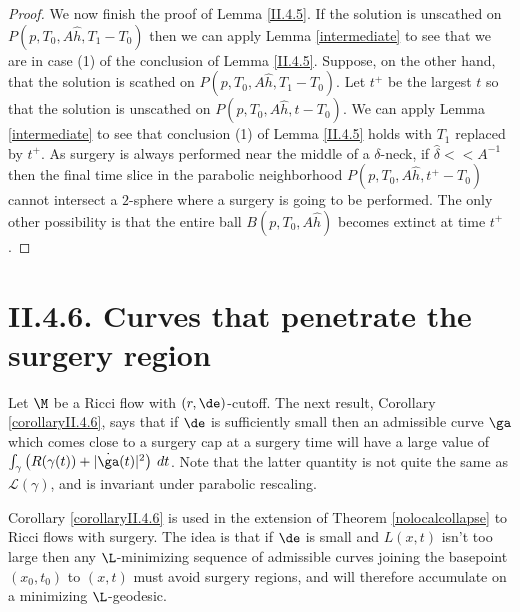 \begin{proof}
We now finish the proof of Lemma \ref{II.4.5}. If the solution is
unscathed on $P(p,T_0,A\hat h,T_1-T_0)$ then we can apply
Lemma \ref{intermediate} to see
that we are in case (1) of the conclusion of Lemma \ref{II.4.5}.
Suppose, on the other hand,
that the solution is scathed on $P(p,T_0,A\hat h,T_1-T_0)$. Let
$t^+$ be the largest $t$ so that the solution is unscathed on
$P(p,T_0,A\hat h,t-T_0)$.
We can apply
Lemma \ref{intermediate} to
see that conclusion (1) of Lemma \ref{II.4.5}
holds with $T_1$ replaced by $t^+$.
As surgery is always performed near the middle of a $\delta$-neck,
if $\hat \delta << A^{-1}$ then the final time slice in the parabolic
neighborhood $P(p,T_0,A\hat h,t^+-T_0)$ cannot intersect a
$2$-sphere where a surgery is going to be performed.
The only other possibility is that
the entire ball $B(p,T_0,A\hat h)$ becomes extinct at time $t^+$.
\end{proof}

\section{II.4.6. Curves that penetrate the surgery region}
\label{II.4.6}

Let $\M$ be a Ricci flow with $(r,\de)$-cutoff.
The next result, Corollary \ref{corollaryII.4.6}, says that if $\de$ is sufficiently small
then an admissible curve $\ga$ which comes close
to a surgery cap at a surgery time will have a large value
of $\int_\gamma \left( R(\gamma(t))+|\dot{\ga}(t)|^2 \right) \: dt$.
Note that the latter quantity is not quite the same as
${\mathcal L}(\gamma)$, and is invariant under parabolic rescaling.

Corollary \ref{corollaryII.4.6} is used in the extension of
Theorem \ref{nolocalcollapse} to Ricci flows with
surgery.   The idea is that if $\de$ is small
and $L(x,t)$ isn't too large then any $\L$-minimizing sequence of
admissible curves joining the basepoint $(x_0,t_0)$ to $(x,t)$
must avoid surgery regions, and will therefore
accumulate on a minimizing $\L$-geodesic.

